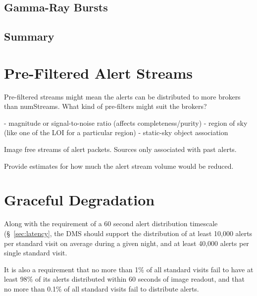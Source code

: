 \documentclass[DM,lsstdraft,authoryear,toc]{lsstdoc}
\begin{document}
\subsection{Gamma-Ray Bursts}\label{ssec:latency_grb}

\subsection{Summary}\label{ssec:latency_summary}




\clearpage
\section{Pre-Filtered Alert Streams} \label{sec:prefilter}

Pre-filtered streams might mean the alerts can be distributed to more brokers than numStreams. What kind of pre-filters might suit the brokers?

 - magnitude or signal-to-noise ratio (affects completeness/purity)
 - region of sky (like one of the LOI for a particular region)
 - static-sky object association
 
 Image free streams of alert packets.
 Sources only associated with past alerts.

Provide estimates for how much the alert stream volume would be reduced.



\clearpage
\section{Graceful Degradation} \label{sec:graceful}

Along with the requirement of a 60 second alert distribution timescale (\S~\ref{sec:latency}, the DMS should support the distribution of at least 10,000 alerts per standard visit on average during a given night, and at least 40,000 alerts per single standard visit. 

It is also a requirement that no more than 1\% of all standard visits fail to have at least 98\% of its alerts distributed within 60 seconds of image readout, and that no more than 0.1\% of all standard visits fail to distribute alerts.
\end{document}
